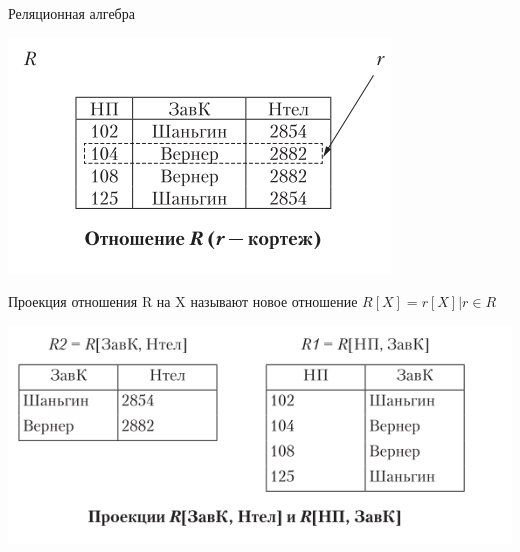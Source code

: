 \documentclass{beamer}
\begin{document}
\begin{frame}{Реляционная алгебра}
\begin{center}
\includegraphics[scale=0.40]{images/ra-01.png}
\end{center}
\begin{block}{Проекция отношения R на X}
называют новое отношение $R[X]= {r[X]|r \in R}$
\end{block}
\begin{center}
\includegraphics[scale=0.50]{images/ra-02.png}
\end{center}
\end{frame}
\end{document}
